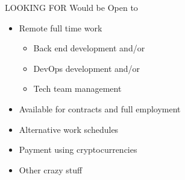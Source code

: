 \documentclass{cv} %
\begin{document}
\begin{rSection}{LOOKING FOR \hspace{2.5in} Would be Open to}

\begin{multicols}{2}
\begin{itemize}
    \itemsep -3pt {} 
    \item Remote full time work
    \begin{itemize}
        \itemsep -3pt {} 
        \item Back end development and/or
        \item DevOps development and/or
        \item Tech team management
    \end{itemize}
    \item Available for contracts and full employment
\end{itemize}

\columnbreak

\begin{itemize}
    \itemsep -3pt {} 
    \item Alternative work schedules
    \item Payment using cryptocurrencies
    \item Other crazy stuff
\end{itemize}

\end{multicols}

\end{rSection} 
\end{document}
